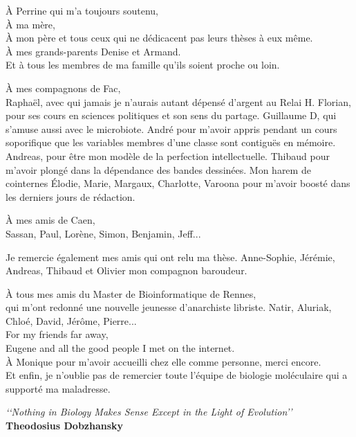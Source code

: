 \documentclass[12pt,a4paper]{article}
\begin{document}
\begin{flushleft}

À Perrine qui m'a toujours soutenu, \\
\vspace{0.5cm}
À ma mère, \\
À mon père et tous ceux qui ne dédicacent pas leurs thèses à eux même.\\
\vspace{0.5cm}
À mes grands-parents Denise et Armand. \\
Et à tous les membres de ma famille qu'ils soient proche ou loin.

\vspace{0.5cm}



À mes compagnons de Fac,\\
Raphaël, avec qui jamais je n'aurais autant dépensé d'argent au Relai H. Florian, pour ses cours en sciences politiques et son sens du partage. Guillaume D,  qui s'amuse aussi avec le microbiote. André pour m'avoir appris pendant un cours soporifique que les variables membres d'une classe sont contiguës en mémoire. Andreas, pour être mon modèle de la perfection intellectuelle. Thibaud pour m'avoir plongé dans la dépendance des bandes dessinées. Mon harem de cointernes Élodie, Marie, Margaux, Charlotte, Varoona pour m'avoir boosté dans les derniers jours de rédaction.

\vspace{0.5cm}
À mes amis de Caen, \\
Sassan, Paul, Lorène, Simon, Benjamin, Jeff...\\
\vspace{0.5cm}

Je remercie également mes amis qui ont relu ma thèse. Anne-Sophie, Jérémie, Andreas, Thibaud et Olivier mon compagnon baroudeur. \\

\vspace{0.5cm}

À tous mes amis du Master de Bioinformatique de Rennes, \\
qui m'ont redonné une nouvelle jeunesse d'anarchiste libriste. Natir, Aluriak, Chloé, David, Jérôme, Pierre... \\
\vspace{0.5cm}
For my friends far away, \\
Eugene and all the good people I met on the internet.\\
\vspace{0.5cm}
À Monique pour m'avoir accueilli chez elle comme personne, merci encore.  \\

\vspace{0.5cm}
Et enfin, je n'oublie pas de remercier toute l'équipe de biologie moléculaire qui a supporté ma maladresse. \\
\vspace{1.5cm}


\centering\textit{‘‘Nothing in Biology Makes Sense Except in the Light of Evolution’’}\\
\centering \textbf{Theodosius Dobzhansky}
\vspace{0.5cm}

\end{flushleft}
\end{document}
